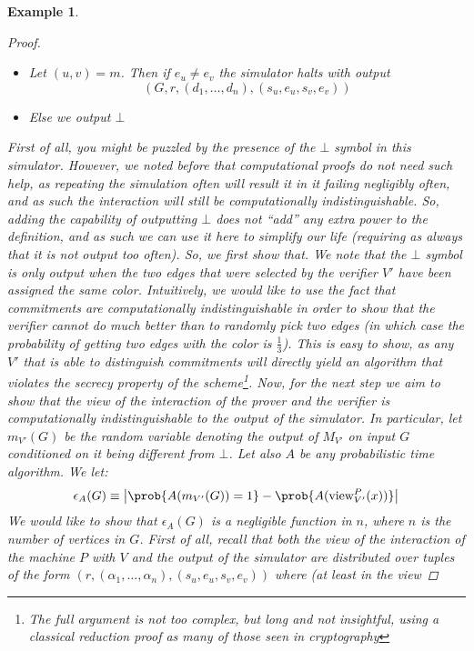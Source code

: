\documentclass{article}
\newtheorem{example}{Example}
\begin{document}
\begin{example}
\begin{proof}
\begin{itemize}
            \item Let $(u, v) = m$. Then if $e_u \neq e_v$ the simulator halts with output \[(G, r, (d_1, \dots, d_n), (s_u, e_u, s_v, e_v))\]
            \item Else we output $\bot$
        \end{itemize}
        First of all, you might be puzzled by the presence of the $\bot$ symbol in this simulator.
        However, we noted before that computational proofs do not need such help, as repeating the simulation often
        will result it in it failing negligibly often, and as such the interaction will still be computationally indistinguishable.
        So, adding the capability of outputting $\bot$ does not \enquote{add} any extra power to the definition, and as such we
        can use it here to simplify our life (requiring as always that it is not output too often).
        So, we first show that. We note that the $\bot$ symbol is only output when
        the two edges that were selected by the verifier $V'$ have been assigned the same color.
        Intuitively, we would like to use the fact that commitments are computationally indistinguishable
        in order to show that the verifier cannot do much better than to randomly pick two edges (in which
        case the probability of getting two edges with the color is $\frac{1}{3}$). This is easy to show,
        as any $V'$ that is able to distinguish commitments will directly yield an algorithm that violates
        the secrecy property of the scheme\footnote{The full argument is not too complex, but long and not
            insightful, using a classical reduction proof as many of those seen in cryptography}.
        Now, for the next step we aim to show that the view of the interaction of the prover and the verifier is
        computationally indistinguishable to the output of the simulator. In particular, let $m_{V'}(G)$ be the
        random variable denoting the output of $M_{V'}$ on input $G$ conditioned on it being different from $\bot$.
        Let also $A$ be any probabilistic time algorithm.
        We let:
        \[ \epsilon_A(G) \equiv \left| \prob{A(m_{V'}(G)) = 1} - \prob{A(\text{view}^{P}_{V'}(x))} \right| \]
        We would like to show that $\epsilon_A(G)$ is a negligible function in $n$, where $n$ is the number
        of vertices in $G$. First of all, recall that both the view of the interaction of the machine $P$ with $V$
        and the output of the simulator are distributed over tuples of the form $(r, (\alpha_1, \dots , \alpha_n), (s_u, e_u, s_v, e_v))$ where (at least in the view

\end{proof}
\end{example}
\end{document}
